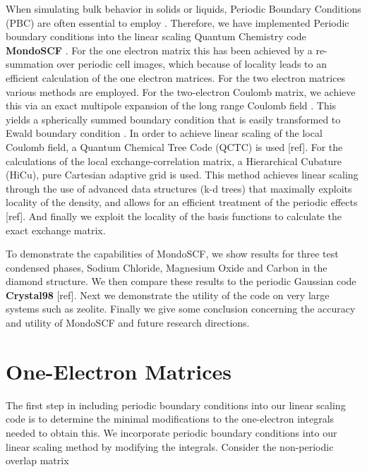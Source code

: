 \commentoutA{\documentclass[prb,aps,twocolumn,showpacs,twocolumngrid,superbib]{revtex4}}
\begin{document}
When simulating bulk behavior in solids or liquids, Periodic Boundary
Conditions (PBC) are often essential to employ \cite{Allen90}. Therefore,
we have implemented Periodic boundary conditions into the linear scaling
Quantum Chemistry code \textbf{MondoSCF} \cite{Challacombe96,Challacombe97,Challacombe99}.
For the one electron matrix this has been achieved by a re-summation
over periodic cell images, which because of locality leads to an efficient
calculation of the one electron matrices. For the two electron matrices
various methods are employed. For the two-electron Coulomb matrix,
we achieve this via an exact multipole expansion of the long range
Coulomb field \cite{White94,Challacombe97b}. This yields a spherically
summed boundary condition that is easily transformed to Ewald boundary
condition \cite{Redlack72,Redlack75}. In order to achieve linear
scaling of the local Coulomb field, a Quantum Chemical Tree Code (QCTC)
is used {[}ref{]}. For the calculations of the local exchange-correlation
matrix, a Hierarchical Cubature (HiCu), pure Cartesian adaptive grid
is used. This method achieves linear scaling through the use of advanced
data structures (k-d trees) that maximally exploits locality of the
density, and allows for an efficient treatment of the periodic effects
{[}ref{]}. And finally we exploit the locality of the basis functions
to calculate the exact exchange matrix. 

To demonstrate the capabilities of MondoSCF, we show results for three
test condensed phases, Sodium Chloride, Magnesium Oxide and Carbon
in the diamond structure. We then compare these results to the periodic
Gaussian code \textbf{Crystal98} {[}ref{]}. \textbf{}Next we demonstrate
the utility of the code on very large systems such as zeolite. Finally
we give some conclusion concerning the accuracy and utility of MondoSCF
and future research directions.


\section{}




\section{One-Electron Matrices}

The first step in including periodic boundary conditions into our
linear scaling code is to determine the minimal modifications to the
one-electron integrals needed to obtain this. We incorporate periodic
boundary conditions into our linear scaling method by modifying the
integrals. Consider the non-periodic overlap matrix
\end{document}
